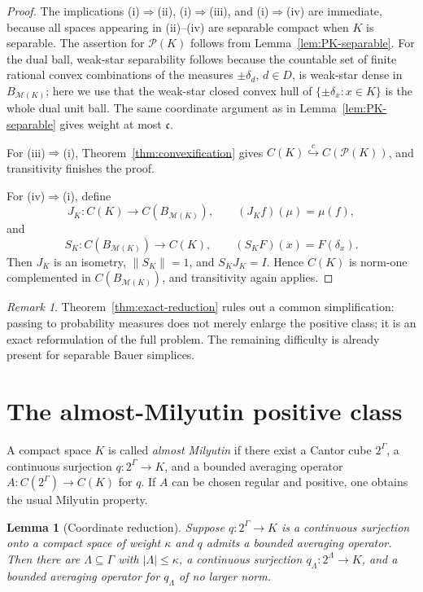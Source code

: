 \documentclass[11pt]{article}
\newtheorem{lemma}[theorem]{Lemma}
\theoremstyle{definition}
\theoremstyle{remark}
\newtheorem{remark}[theorem]{Remark}
\newcommand{\C}{C}
\newcommand{\cc}{\mathfrak c}
\newcommand{\Pp}{\mathcal P}
\newcommand{\M}{\mathcal M}
\newcommand{\Id}{I}
\newcommand{\hookc}{\stackrel{c}{\hookrightarrow}}
\begin{document}
\begin{proof}
The implications (i)$\Rightarrow$(ii), (i)$\Rightarrow$(iii), and
(i)$\Rightarrow$(iv) are immediate, because all spaces appearing in
(ii)--(iv) are separable compact when $K$ is separable.  The assertion for
$\Pp(K)$ follows from Lemma~\ref{lem:PK-separable}.  For the dual ball,
weak-star separability follows because the countable set of finite rational
convex combinations of the measures $\pm\delta_d$, $d\in D$, is weak-star
dense in $B_{\M(K)}$; here we use that the weak-star closed convex hull of
$\{\pm\delta_x:x\in K\}$ is the whole dual unit ball.  The same coordinate
argument as in Lemma~\ref{lem:PK-separable} gives weight at most $\cc$.

For (iii)$\Rightarrow$(i), Theorem~\ref{thm:convexification} gives
$\C(K)\hookc\C(\Pp(K))$, and transitivity finishes the proof.

For (iv)$\Rightarrow$(i), define
\[
 J_K:\C(K)\to\C(B_{\M(K)}),\qquad (J_Kf)(\mu)=\mu(f),
\]
and
\[
 S_K:\C(B_{\M(K)})\to\C(K),\qquad (S_KF)(x)=F(\delta_x).
\]
Then $J_K$ is an isometry, $\|S_K\|=1$, and $S_KJ_K=\Id$.  Hence
$\C(K)$ is norm-one complemented in $\C(B_{\M(K)})$, and transitivity
again applies.
\end{proof}

\begin{remark}
Theorem~\ref{thm:exact-reduction} rules out a common simplification: passing
to probability measures does not merely enlarge the positive class; it is
an exact reformulation of the full problem.  The remaining difficulty is
already present for separable Bauer simplices.
\end{remark}

\section{The almost-Milyutin positive class}

A compact space $K$ is called \emph{almost Milyutin} if there exist a
Cantor cube $2^\Gamma$, a continuous surjection $q:2^\Gamma\to K$, and a
bounded averaging operator $A:\C(2^\Gamma)\to\C(K)$ for $q$.  If $A$ can be
chosen regular and positive, one obtains the usual Milyutin property.

\begin{lemma}[Coordinate reduction]\label{lem:coordinate-reduction}
Suppose $q:2^\Gamma\to K$ is a continuous surjection onto a compact space
of weight $\kappa$ and $q$ admits a bounded averaging operator.  Then there
are $\Lambda\subseteq\Gamma$ with $|\Lambda|\leq\kappa$, a continuous
surjection $q_\Lambda:2^\Lambda\to K$, and a bounded averaging operator for
$q_\Lambda$ of no larger norm.
\end{lemma}
\end{document}
